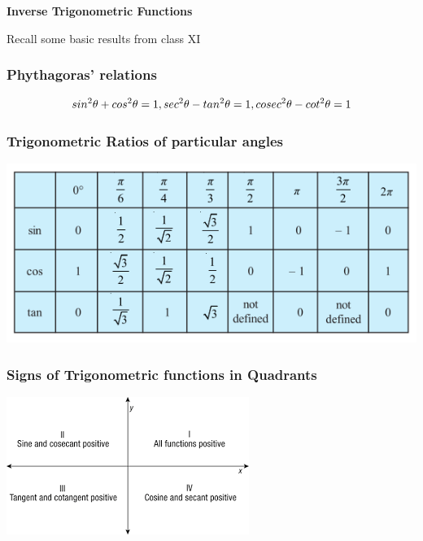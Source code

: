 \documentclass[12pt]{article}
\begin{document}
\begin{center}
    {\LARGE \textbf{Inverse Trigonometric Functions} }
\end{center}

\begin{multicols}{2}
Recall some basic results from class XI
\subsubsection*{Phythagoras' relations}
  $$sin^2 \theta + cos^2 \theta =1 \\
,sec^2 \theta - tan^2 \theta = 1 \\
,cosec^2 \theta - cot^2 \theta =1
$$


\subsubsection*{ Trigonometric Ratios of particular angles}
        \begin{center}
          \includegraphics[scale=0.45]{im8.png}
        \end{center}
\subsubsection*{Signs of Trigonometric functions in Quadrants}
            \begin{center}
              \includegraphics[scale=0.7]{img9.png}
            \end{center}
          

\end{multicols}
\end{document}
